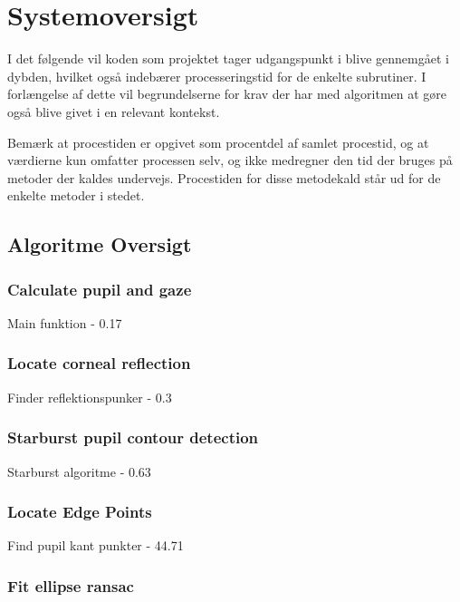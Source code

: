 \documentclass[analyse.tex]{subfiles}
\begin{document}
\section{Systemoversigt}
I det følgende vil koden som projektet tager udgangspunkt i blive gennemgået i dybden, hvilket også indebærer processeringstid for de enkelte subrutiner. I forlængelse af dette vil begrundelserne for krav der har med algoritmen at gøre også blive givet i en relevant kontekst.

Bemærk at procestiden er opgivet som procentdel af samlet procestid, og at værdierne kun omfatter processen selv, og ikke medregner den tid der bruges på metoder der kaldes undervejs. Procestiden for disse metodekald står ud for de enkelte metoder i stedet.
	
\subsection{Algoritme Oversigt}

\subsubsection{Calculate pupil and gaze}

Main funktion - 0.17%

\subsubsection{Locate corneal reflection}

Finder reflektionspunker - 0.3%

\subsubsection{Starburst pupil contour detection}

Starburst algoritme - 0.63%

\subsubsection{Locate Edge Points}

Find pupil kant punkter - 44.71%

\subsubsection{Fit ellipse ransac}
\end{document}
